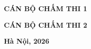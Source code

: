 \begin{titlepage}
\vspace{0.65cm}
\noindent\begin{minipage}[t]{0.45\textwidth}
\centering\bfseries\fontsize{12pt}{16pt}\selectfont CÁN BỘ CHẤM THI 1\par
\vspace{0.95cm}
{\fontsize{12pt}{15pt}\selectfont \CanBoChamThiMot\par}
\end{minipage}\hfill
\begin{minipage}[t]{0.45\textwidth}
\centering\bfseries\fontsize{12pt}{16pt}\selectfont CÁN BỘ CHẤM THI 2\par
\vspace{0.95cm}
{\fontsize{12pt}{15pt}\selectfont \CanBoChamThiHai\par}
\end{minipage}

\vfill
{\bfseries\fontsize{13pt}{17pt}\selectfont Hà Nội, 2026 \Nam\par}
\end{titlepage}
